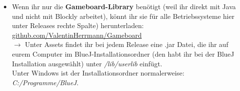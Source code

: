{\begin{itemize}
\begin{itemize}
        Wenn ihr auf einem anderen Betriebssystem mit Blockly arbeiten müsst, meldet euch bitte bei eurer Lehrkraft.
        \item Wenn ihr nur die \textbf{Gameboard-Library} benötigt (weil ihr direkt mit Java und nicht mit Blockly arbeitet), könnt ihr sie für alle Betriebssysteme hier unter Releases rechte Spalte) herunterladen: \href{https://github.com/ValentinHerrmann/Gameboard}{github.com/ValentinHerrmann/Gameboard}\\
        $\rightarrow$ Unter Assets findet ihr bei jedem Release eine .jar Datei, die ihr auf eurem Computer im BlueJ-Installationsordner (den habt ihr bei der BlueJ Installation ausgewählt) unter \emph{/lib/userlib} einfügt.\\
        Unter Windows ist der Installationsordner normalerweise: \emph{C:/Programme/BlueJ}.
    \end{itemize}
\end{itemize}

}
